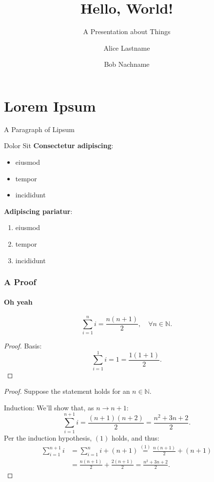 \documentclass[notheorems]{beamer}
\title{Hello, World!}
\subtitle{A Presentation about Things}
\author{Alice Lastname\inst{1} \and Bob Nachname\inst{2}}
\begin{document}
\maketitle

\section{Lorem Ipsum}

\begin{frame}{A Paragraph of Lipsum}
  \lipsum[1]
\end{frame}

\begin{frame}{Dolor Sit}
\textbf{Consectetur adipiscing}:
  \begin{itemize}
    \item eiusmod
    \item tempor
    \item incididunt
  \end{itemize}

\textbf{Adipiscing pariatur}:
  \begin{enumerate}
    \item eiusmod
    \item tempor
    \item incididunt
  \end{enumerate}
\end{frame}


\begin{frame}
  \frametitle{A Proof}
  \framesubtitle{Oh yeah}
  \begin{thm}
    \begin{equation*}
      \sum_{i=1}^n i = \frac{n(n+1)}{2},%
      \quad\forall n\in\mathbb{N}.
    \end{equation*}
  \end{thm}
  \begin{proof}\noqed
    Basis:
    \begin{equation*}
      \sum_{i=1}^1 i = 1 = \frac{1(1+1)}{2}.
    \end{equation*}
  \end{proof}
\end{frame}
\begin{frame}
  \begin{proof}
    Suppose the statement holds for an
    $n\in\mathbb{N}$.

    Induction:
    We'll show that, as $n\longrightarrow n+1$:
    \begin{equation*}
      \sum_{i=1}^{n+1} i = \frac{(n+1)(n+2)}{2}
      = \frac{n^2 + 3n + 2}{2}.
    \end{equation*}
    Per the induction hypothesis, $(1)$ holds, and thus:
    \begin{align*}
      \sum_{i=1}^{n+1} i
      &= \sum_{i=1}^{n} i + (n+1)
      \overset{(1)}{=} \frac{n(n+1)}{2} + (n+1) \\
      &= \frac{n(n+1)}{2} + \frac{2(n+1)}{2}
      = \frac{n^2 + 3n + 2}{2}.
    \end{align*}
  \end{proof}
\end{frame}
\end{document}
